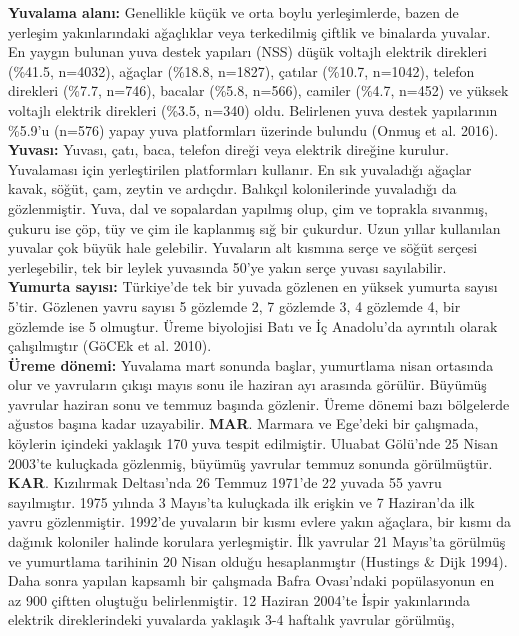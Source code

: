 \documentclass[
  letterpaper,
  DIV=11,
  numbers=noendperiod]{scrreprt}
\begin{document}
\textbf{Yuvalama alanı:} Genellikle küçük ve orta boylu yerleşimlerde,
bazen de yerleşim yakınlarındaki ağaçlıklar veya terkedilmiş çiftlik ve
binalarda yuvalar. En yaygın bulunan yuva destek yapıları (NSS) düşük
voltajlı elektrik direkleri (\%41.5, n=4032), ağaçlar (\%18.8, n=1827),
çatılar (\%10.7, n=1042), telefon direkleri (\%7.7, n=746), bacalar
(\%5.8, n=566), camiler (\%4.7, n=452) ve yüksek voltajlı elektrik
direkleri (\%3.5, n=340) oldu. Belirlenen yuva destek yapılarının
\%5.9'u (n=576) yapay yuva platformları üzerinde bulundu (Onmuş et al.
2016).\\
\textbf{Yuvası:} Yuvası, çatı, baca, telefon direği veya elektrik
direğine kurulur. Yuvalaması için yerleştirilen platformları kullanır.
En sık yuvaladığı ağaçlar kavak, söğüt, çam, zeytin ve ardıçdır.
Balıkçıl kolonilerinde yuvaladığı da gözlenmiştir. Yuva, dal ve
sopalardan yapılmış olup, çim ve toprakla sıvanmış, çukuru ise çöp, tüy
ve çim ile kaplanmış sığ bir çukurdur. Uzun yıllar kullanılan yuvalar
çok büyük hale gelebilir. Yuvaların alt kısmına serçe ve söğüt serçesi
yerleşebilir, tek bir leylek yuvasında 50'ye yakın serçe yuvası
sayılabilir.\\
\textbf{Yumurta sayısı:} Türkiye'de tek bir yuvada gözlenen en yüksek
yumurta sayısı 5'tir. Gözlenen yavru sayısı 5 gözlemde 2, 7 gözlemde 3,
4 gözlemde 4, bir gözlemde ise 5 olmuştur. Üreme biyolojisi Batı ve İç
Anadolu'da ayrıntılı olarak çalışılmıştır (GöCEk et al. 2010).\\
\textbf{Üreme dönemi:} Yuvalama mart sonunda başlar, yumurtlama nisan
ortasında olur ve yavruların çıkışı mayıs sonu ile haziran ayı arasında
görülür. Büyümüş yavrular haziran sonu ve temmuz başında gözlenir. Üreme
dönemi bazı bölgelerde ağustos başına kadar uzayabilir. \textbf{MAR}.
Marmara ve Ege'deki bir çalışmada, köylerin içindeki yaklaşık 170 yuva
tespit edilmiştir. Uluabat Gölü'nde 25 Nisan 2003'te kuluçkada
gözlenmiş, büyümüş yavrular temmuz sonunda görülmüştür. \textbf{KAR}.
Kızılırmak Deltası'nda 26 Temmuz 1971'de 22 yuvada 55 yavru sayılmıştır.
1975 yılında 3 Mayıs'ta kuluçkada ilk erişkin ve 7 Haziran'da ilk yavru
gözlenmiştir. 1992'de yuvaların bir kısmı evlere yakın ağaçlara, bir
kısmı da dağınık koloniler halinde korulara yerleşmiştir. İlk yavrular
21 Mayıs'ta görülmüş ve yumurtlama tarihinin 20 Nisan olduğu
hesaplanmıştır (Hustings \& Dijk 1994). Daha sonra yapılan kapsamlı bir
çalışmada Bafra Ovası'ndaki popülasyonun en az 900 çiftten oluştuğu
belirlenmiştir. 12 Haziran 2004'te İspir yakınlarında elektrik
direklerindeki yuvalarda yaklaşık 3-4 haftalık yavrular görülmüş,
\end{document}
